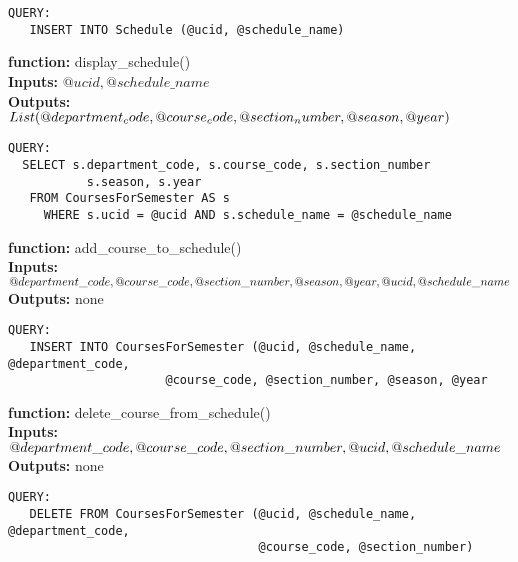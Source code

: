 \documentclass[12pt]{article} %
\begin{document}
\begin{verbatim}
QUERY:
   INSERT INTO Schedule (@ucid, @schedule_name)
\end{verbatim}  
\textbf{function:} display\_schedule()\\
\textbf{Inputs:} $@ucid, @schedule\_name$\\
\textbf{Outputs:} $List (@department_code, @course_code, \\
@section_number, @season, @year)$\\
\begin{verbatim}
QUERY:
  SELECT s.department_code, s.course_code, s.section_number
           s.season, s.year
   FROM CoursesForSemester AS s
     WHERE s.ucid = @ucid AND s.schedule_name = @schedule_name
\end{verbatim}  
\textbf{function:} add\_course\_to\_schedule()\\
\textbf{Inputs:} $@department\_code, @course\_code, @section\_number, \\
@season, @year, @ucid, @schedule\_name$\\
\textbf{Outputs:} none
\begin{verbatim}
QUERY:
   INSERT INTO CoursesForSemester (@ucid, @schedule_name, @department_code,
                      @course_code, @section_number, @season, @year
\end{verbatim}  
\textbf{function:} delete\_course\_from\_schedule()\\
\textbf{Inputs:} $@department\_code, @course\_code, @section\_number, \\
@ucid, @schedule\_name$\\
\textbf{Outputs:} none
\begin{verbatim}
QUERY:
   DELETE FROM CoursesForSemester (@ucid, @schedule_name, @department_code,
                                   @course_code, @section_number)
\end{verbatim}  
\end{document}
